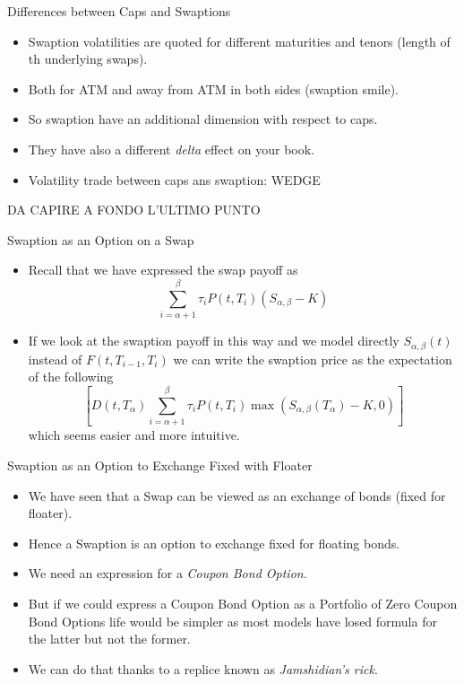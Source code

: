 \documentclass{beamer}
\begin{document}
\begin{frame}{Differences between Caps and Swaptions}
	\begin{itemize}
		\item Swaption volatilities are quoted for different maturities and tenors (length of th underlying swaps).
		\item Both for ATM and away from ATM in both sides (swaption smile).
		\item So swaption have an additional dimension with respect to caps.
		\item They have also a different \emph{delta} effect on your book.
		\item Volatility trade between caps ans swaption: WEDGE
	\end{itemize}
	DA CAPIRE A FONDO L'ULTIMO PUNTO
\end{frame}

\begin{frame}{Swaption as an Option on a Swap}
	\begin{itemize}
		\item Recall that we have expressed the swap payoff as 
		\begin{equation}
			\sum_{i=\alpha+1}^\beta \tau_i P(t,T_i)(S_{\alpha,\beta}-K)
		\end{equation}
		\item If we look at the swaption payoff in this way and we model directly $S_{\alpha,\beta}(t)$ instead of $F(t, T_{i-1},T_i)$ we can write the swaption price as the expectation of the following
		\begin{equation}
			\left[D(t,T_\alpha)\sum_{i=\alpha+1}^\beta \tau_i P(t,T_i)\max(S_{\alpha,\beta}(T_\alpha)-K, 0)\right]
		\end{equation}
		which seems easier and more intuitive.
	\end{itemize}
\end{frame}

\begin{frame}{Swaption as an Option to Exchange Fixed with Floater}
	\begin{itemize}
		\item We have seen that a Swap can be viewed as an exchange of bonds (fixed for floater).
		\item Hence a Swaption is an option to exchange fixed for floating bonds.
		\item We need an expression for a \emph{Coupon Bond Option}.
		\item But if we could express a Coupon Bond Option as a Portfolio of Zero Coupon Bond Options life would be simpler as most models have losed formula for the latter but not the former.
		\item We can do that thanks to a replice known as \emph{Jamshidian's rick}.
	\end{itemize}
\end{frame}
\end{document}
